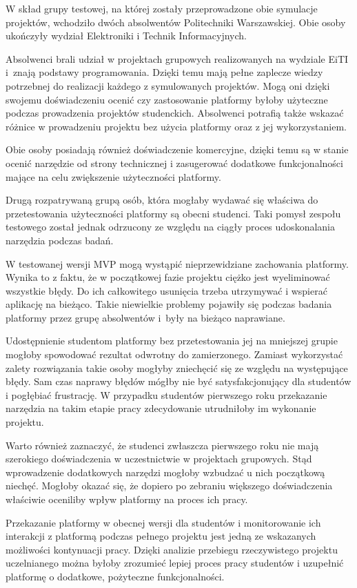 W skład grupy testowej, na której zostały przeprowadzone obie symulacje projektów, wchodziło dwóch absolwentów Politechniki Warszawskiej.
Obie osoby ukończyły wydział Elektroniki i Technik Informacyjnych.

Absolwenci brali udział w projektach grupowych realizowanych na wydziale EiTI i~znają podstawy programowania.
Dzięki temu mają pełne zaplecze wiedzy potrzebnej do realizacji każdego z symulowanych projektów.
Mogą oni dzięki swojemu doświadczeniu ocenić czy zastosowanie platformy byłoby użyteczne podczas prowadzenia projektów studenckich.
Absolwenci potrafią także wskazać różnice w prowadzeniu projektu bez użycia platformy oraz z jej wykorzystaniem.

Obie osoby posiadają również doświadczenie komercyjne, dzięki temu są w stanie ocenić narzędzie od strony technicznej i zasugerować dodatkowe funkcjonalności mające na celu zwiększenie użyteczności platformy.

Drugą rozpatrywaną grupą osób, która mogłaby wydawać się właściwa do przetestowania użyteczności platformy są obecni studenci.
Taki pomysł zespołu testowego został jednak odrzucony ze względu na ciągły proces udoskonalania narzędzia podczas badań.

W testowanej wersji MVP mogą wystąpić nieprzewidziane zachowania platformy.
Wynika to z faktu, że w początkowej fazie projektu ciężko jest wyeliminować wszystkie błędy.
Do ich całkowitego usunięcia trzeba utrzymywać i wspierać aplikację na bieżąco.
Takie niewielkie problemy pojawiły się podczas badania platformy przez grupę absolwentów i~były na bieżąco naprawiane.

Udostępnienie studentom platformy bez przetestowania jej na mniejszej grupie mogłoby spowodować rezultat odwrotny do zamierzonego.
Zamiast wykorzystać zalety rozwiązania takie osoby mogłyby zniechęcić się ze względu na występujące błędy.
Sam czas naprawy błędów mógłby nie być satysfakcjonujący dla studentów i pogłębiać frustrację.
W przypadku studentów pierwszego roku przekazanie narzędzia na takim etapie pracy zdecydowanie utrudniłoby im wykonanie projektu.

Warto również zaznaczyć, że studenci zwłaszcza pierwszego roku nie mają szerokiego doświadczenia w uczestnictwie w projektach grupowych.
Stąd wprowadzenie dodatkowych narzędzi mogłoby wzbudzać u nich początkową niechęć.
Mogłoby okazać się, że dopiero po zebraniu większego doświadczenia właściwie oceniliby wpływ platformy na proces ich pracy.

Przekazanie platformy w obecnej wersji dla studentów i monitorowanie ich interakcji z platformą podczas pełnego projektu jest jedną ze wskazanych możliwości kontynuacji pracy.
Dzięki analizie przebiegu rzeczywistego projektu uczelnianego można byłoby zrozumieć lepiej proces pracy studentów i uzupełnić platformę o dodatkowe, pożyteczne funkcjonalności.


